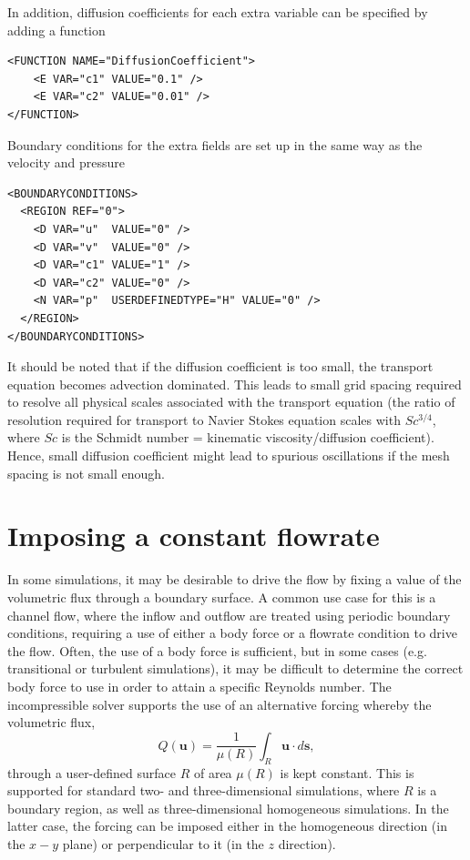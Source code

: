 In addition, diffusion coefficients for each extra variable can be specified by adding a function
\begin{lstlisting}[style=XMLStyle]
<FUNCTION NAME="DiffusionCoefficient">
    <E VAR="c1" VALUE="0.1" />
    <E VAR="c2" VALUE="0.01" />
</FUNCTION>
\end{lstlisting}

Boundary conditions for the extra fields are set up in the same way as the velocity and pressure
\begin{lstlisting}[style=XMLStyle]
<BOUNDARYCONDITIONS>
  <REGION REF="0">
    <D VAR="u"  VALUE="0" />
    <D VAR="v"  VALUE="0" />
    <D VAR="c1" VALUE="1" />
    <D VAR="c2" VALUE="0" />
    <N VAR="p"  USERDEFINEDTYPE="H" VALUE="0" />
  </REGION>
</BOUNDARYCONDITIONS>
\end{lstlisting}

It should be noted that if the diffusion coefficient is too small, the transport equation becomes advection dominated.
This leads to small grid spacing required to resolve all physical scales associated with the transport equation
(the ratio of resolution required for transport to Navier Stokes equation scales with $Sc^{3/4}$, where $Sc$ is the
Schmidt number = kinematic viscosity/diffusion coefficient). Hence, small diffusion coefficient might lead to spurious
oscillations if the mesh spacing is not small enough.

\section{Imposing a constant flowrate}

In some simulations, it may be desirable to drive the flow by fixing a value of
the volumetric flux through a boundary surface. A common use case for this is a
channel flow, where the inflow and outflow are treated using periodic boundary
conditions, requiring a use of either a body force or a flowrate condition to
drive the flow. Often, the use of a body force is sufficient, but in some cases
(e.g. transitional or turbulent simulations), it may be difficult to determine
the correct body force to use in order to attain a specific Reynolds number. The
incompressible solver supports the use of an alternative forcing whereby the
volumetric flux,
%
\[
  Q(\mathbf{u}) = \frac{1}{\mu(R)} \int_R \mathbf{u}\cdot d\mathbf{s},
\]
%
through a user-defined surface $R$ of area $\mu(R)$ is kept constant. This is
supported for standard two- and three-dimensional simulations, where $R$ is a
boundary region, as well as three-dimensional homogeneous simulations. In the
latter case, the forcing can be imposed either in the homogeneous direction (in
the $x-y$ plane) or perpendicular to it (in the $z$ direction).

